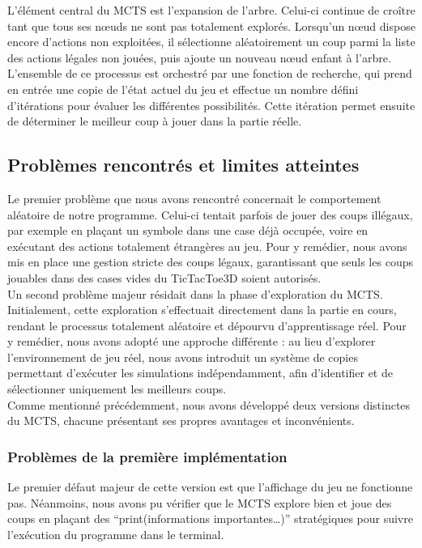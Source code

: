 \documentclass{article}
\begin{document}
L’élément central du MCTS est l’expansion de l’arbre. Celui-ci continue de croître tant que tous ses nœuds ne sont pas totalement explorés. Lorsqu’un nœud dispose encore d’actions non exploitées, il sélectionne aléatoirement un coup parmi la liste des actions légales non jouées, puis ajoute un nouveau nœud enfant à l’arbre.\\

L’ensemble de ce processus est orchestré par une fonction de recherche, qui prend en entrée une copie de l’état actuel du jeu et effectue un nombre défini d’itérations pour évaluer les différentes possibilités. Cette itération permet ensuite de déterminer le meilleur coup à jouer dans la partie réelle.

\subsection{Problèmes rencontrés et limites atteintes}

\quad Le premier problème que nous avons rencontré concernait le comportement aléatoire de notre programme. Celui-ci tentait parfois de jouer des coups illégaux, par exemple en plaçant un symbole dans une case déjà occupée, voire en exécutant des actions totalement étrangères au jeu. Pour y remédier, nous avons mis en place une gestion stricte des coups légaux, garantissant que seuls les coups jouables dans des cases vides du TicTacToe3D soient autorisés.\\

Un second problème majeur résidait dans la phase d’exploration du MCTS. Initialement, cette exploration s’effectuait directement dans la partie en cours, rendant le processus totalement aléatoire et dépourvu d’apprentissage réel. Pour y remédier, nous avons adopté une approche différente : au lieu d’explorer l’environnement de jeu réel, nous avons introduit un système de copies permettant d’exécuter les simulations indépendamment, afin d’identifier et de sélectionner uniquement les meilleurs coups.\\

Comme mentionné précédemment, nous avons développé deux versions distinctes du MCTS, chacune présentant ses propres avantages et inconvénients.

    \subsubsection{Problèmes de la première implémentation}
    
    \quad Le premier défaut majeur de cette version est que l'affichage du jeu ne fonctionne pas. Néanmoins, nous avons pu vérifier que le MCTS explore bien et joue des coups en plaçant des “print(informations importantes…)” stratégiques pour suivre l'exécution du programme dans le terminal.\\
    
\end{document}
